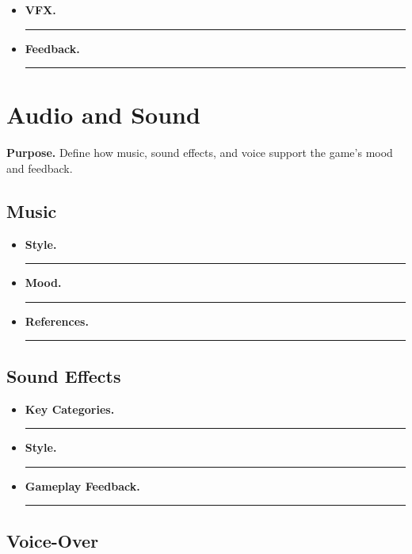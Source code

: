 \documentclass[12pt]{article}
\newcommand{\placeholder}[1]{\rule[-0.4em]{0pt}{2em}\rule{0.62\linewidth}{0.4pt}}
\begin{document}
\begin{itemize}
    \item \textbf{VFX.} \placeholder{Particles, explosions, spell effects, hit flashes, etc.}
    \item \textbf{Feedback.} \placeholder{How visual effects reinforce hits, damage, healing, status changes, etc.}
\end{itemize}

\section{Audio and Sound}

\textbf{Purpose.} Define how music, sound effects, and voice support the game’s mood and feedback.

\subsection{Music}

\begin{itemize}
    \item \textbf{Style.} \placeholder{Epic orchestral, lo-fi, retro chiptune, ambient, etc.}
    \item \textbf{Mood.} \placeholder{How the music supports gameplay, pacing, and emotion.}
    \item \textbf{References.} \placeholder{Inspiration from other games, films, or artists.}
\end{itemize}

\subsection{Sound Effects}

\begin{itemize}
    \item \textbf{Key Categories.} \placeholder{Movement, combat, environment, UI, system alerts.}
    \item \textbf{Style.} \placeholder{Realistic, arcade-like, comedic, minimalistic, etc.}
    \item \textbf{Gameplay Feedback.} \placeholder{Distinct audio cues for damage, warnings, rewards, etc.}
\end{itemize}

\subsection{Voice-Over}
\end{document}
